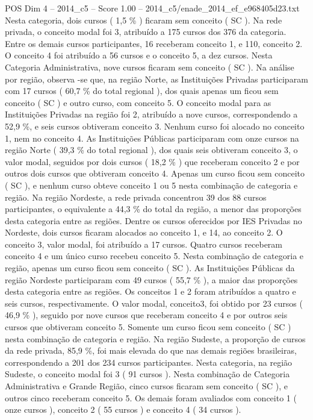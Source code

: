 \begin{textsample}{POS Dim 4 – 2014\_c5 – Score 1.00 – 2014\_c5/enade\_2014\_ef\_e968405d23.txt}
Nesta categoria, dois cursos ( 1,5 \% ) ficaram sem conceito ( SC ).
Na rede privada, o conceito modal foi 3, atribuído a 175 cursos dos 376 da categoria.
Entre os demais cursos participantes, 16 receberam conceito 1, e 110, conceito 2.
O conceito 4 foi atribuído a 56 cursos e o conceito 5, a dez cursos.
Nesta Categoria Administrativa, nove cursos ficaram sem conceito ( SC ).
Na análise por região, observa -se que, na região Norte, as Instituições Privadas participaram com 17 cursos ( 60,7 \% do total regional ), dos quais apenas um ficou sem conceito ( SC ) e outro curso, com conceito 5.
O conceito modal para as Instituições Privadas na região foi 2, atribuído a nove cursos, correspondendo a 52,9 \%, e seis cursos obtiveram conceito 3.
Nenhum curso foi alocado no conceito 1, nem no conceito 4.
As Instituições Públicas participaram com onze cursos na região Norte ( 39,3 \% do total regional ), dos quais seis obtiveram conceito 3, o valor modal, seguidos por dois cursos ( 18,2 \% ) que receberam conceito 2 e por outros dois cursos que obtiveram conceito 4.
Apenas um curso ficou sem conceito ( SC ), e nenhum curso obteve conceito 1 ou 5 nesta combinação de categoria e região.
Na região Nordeste, a rede privada concentrou 39 dos 88 cursos participantes, o equivalente a 44,3 \% do total da região, a menor das proporções desta categoria entre as regiões.
Dentre os cursos oferecidos por IES Privadas no Nordeste, dois cursos ficaram alocados ao conceito 1, e 14, ao conceito 2.
O conceito 3, valor modal, foi atribuído a 17 cursos.
Quatro cursos receberam conceito 4 e um único curso recebeu conceito 5.
Nesta combinação de categoria e região, apenas um curso ficou sem conceito ( SC ).
As Instituições Públicas da região Nordeste participaram com 49 cursos ( 55,7 \% ), a maior das proporções desta categoria entre as regiões.
Os conceitos 1 e 2 foram atribuídos a quatro e seis cursos, respectivamente.
O valor modal, conceito3, foi obtido por 23 cursos ( 46,9 \% ), seguido por nove cursos que receberam conceito 4 e por outros seis cursos que obtiveram conceito 5.
Somente um curso ficou sem conceito ( SC ) nesta combinação de categoria e região.
Na região Sudeste, a proporção de cursos da rede privada, 85,9 \%, foi mais elevada do que nas demais regiões brasileiras, correspondendo a 201 dos 234 cursos participantes.
Nesta categoria, na região Sudeste, o conceito modal foi 3 ( 91 cursos ).
Nesta combinação de Categoria Administrativa e Grande Região, cinco cursos ficaram sem conceito ( SC ), e outros cinco receberam conceito 5.
Os demais foram avaliados com conceito 1 ( onze cursos ), conceito 2 ( 55 cursos ) e conceito 4 ( 34 cursos ).

\end{textsample}
